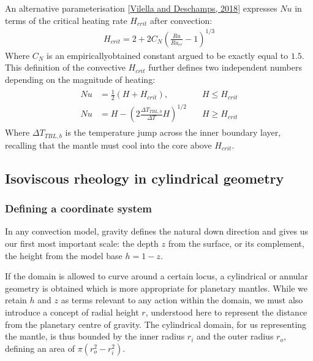 \documentclass[letterpaper,10pt,english]{jupyterBook}
\begin{document}
\sphinxAtStartPar
An alternative parameterisation {[}\hyperlink{cite.references:id745}{Vilella and Deschamps, 2018}{]} expresses \(Nu\) in terms of the critical heating rate \(H_{crit}\) after convection:
\begin{equation*}
\begin{split}
H_{crit} = 2 + 2 C_N {\left( \frac{Ra}{{Ra}_{cr}} - 1 \right)}^{1/3}
\end{split}
\end{equation*}
\sphinxAtStartPar
Where \(C_N\) is an empirically\sphinxhyphen{}obtained constant argued to be exactly equal to \(1.5\). This definition of the convective \(H_{crit}\) further defines two independent  numbers depending on the magnitude of heating:
\begin{equation*}
\begin{split} \begin{align*}
Nu &= \frac{1}{2} \left( H + H_{crit} \right), \quad &H \le H_{crit} \\
Nu &=  H - {\left( 2 \frac{{\Delta T}_{TBL,b}}{\Delta T} H \right)}^{1/2} \quad &H \ge H_{crit}
\end{align*} \end{split}
\end{equation*}
\sphinxAtStartPar
Where \({\Delta T}_{TBL,b}\) is the temperature jump across the inner boundary layer, recalling that the mantle must cool into the core above \(H_{crit}\).


\subsection{Isoviscous rheology in cylindrical geometry}
\label{\detokenize{content/chapter_04_isoviscous/background/cylindrical:isoviscous-rheology-in-cylindrical-geometry}}\label{\detokenize{content/chapter_04_isoviscous/background/cylindrical::doc}}

\subsubsection{Defining a coordinate system}
\label{\detokenize{content/chapter_04_isoviscous/background/cylindrical:defining-a-coordinate-system}}
\sphinxAtStartPar
In any convection model, gravity defines the natural down direction and gives us our first most important scale: the depth \(z\) from the surface, or its complement, the height from the model base \(h=1-z\).

\sphinxAtStartPar
If the domain is allowed to curve around a certain locus, a cylindrical or annular geometry is obtained which is more appropriate for planetary mantles. While we retain \(h\) and \(z\) as terms relevant to any action within the domain, we must also introduce a concept of radial height \(r\), understood here to represent the distance from the planetary centre of gravity. The cylindrical domain, for us representing the mantle, is thus bounded by the inner radius \(r_{i}\) and the outer radius \(r_{o}\), defining an area of \(\pi(r_o^2 - r_i^2)\).
\end{document}
